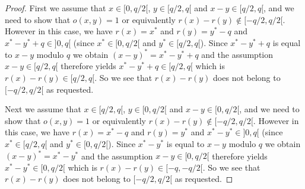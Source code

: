 \documentclass{article}
\begin{document}
\begin{proof}
  First we assume that $x\in[0,q/2[$, $y\in[q/2,q[$ and $x-y\in[q/2,q[$, and 
  we need to show that $o(x,y)=1$ or equivalently $r(x)-r(y)\not\in[-q/2,q/2[$.
  However in this case, we have $r(x)=x^{*}$ and $r(y)=y^{*}-q$ and 
  $x^{*}-y^{*}+q\in]0,q[$ (since $x^{*}\in[0,q/2[$ and $y^{*}\in[q/2,q[$).
  Since $x^{*}-y^{*}+q$ is equal to $x-y$ modulo $q$ we obtain
  $(x-y)^{*}=x^{*}-y^{*}+q$ and the assumption $x-y\in[q/2,q[$ therefore
  yields $x^{*}-y^{*}+q\in[q/2,q[$ which is $r(x)-r(y)\in[q/2,q[$. So we see
  that $r(x)-r(y)$ does not belong to $[-q/2,q/2[$ as requested.

  Next we assume that $x\in[q/2,q[$, $y\in[0,q/2[$ and $x-y\in[0,q/2[$,
  and we need to show that $o(x,y)=1$ or equivalently 
  $r(x)-r(y)\not\in[-q/2,q/2[$. However in this case, we have $r(x)=x^{*}-q$
  and $r(y)=y^{*}$ and $x^{*}-y^{*}\in]0,q[$ (since $x^{*}\in[q/2,q[$
  and $y^{*}\in[0,q/2[$). Since $x^{*}-y^{*}$ is equal to $x-y$ modulo $q$
  we obtain $(x-y)^{*}=x^{*}-y^{*}$ and the assumption $x-y\in[0,q/2[$
  therefore yields $x^{*}-y^{*}\in[0,q/2[$ which is $r(x)-r(y)\in[-q,-q/2[$.
  So we see that $r(x)-r(y)$ does not belong to $[-q/2,q/2[$ as requested.


\end{proof}
\end{document}
